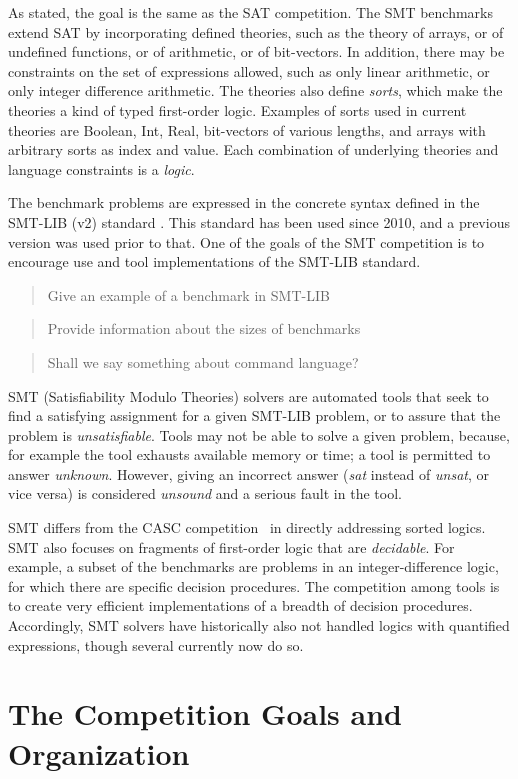 \documentclass[twosize,11pt]{article}
\newcommand{\comment}[2]{\begin{quote}\sc #1\marginpar{\textcolor{red}{$\ast^{\mbox{#2}}$}}\end{quote}}
\newcommand{\tjark}[1]{\comment{#1}{TW}}
\newcommand{\davidd}[1]{\comment{#1}{DD}}
\begin{document}
As stated, the goal is the same as the SAT competition. The SMT benchmarks extend SAT by incorporating defined theories, such as the theory of arrays, or of undefined functions, or of arithmetic, or of bit-vectors. In addition, there may be constraints on the set of expressions allowed, such as only linear arithmetic, or only integer difference arithmetic. The theories also define \textit{sorts}, which make the theories a kind of typed first-order logic. Examples of sorts used in current theories are Boolean, Int, Real, bit-vectors of various lengths, and arrays with arbitrary sorts as index and value. Each combination of underlying theories and language constraints is a \textit{logic}.

The benchmark problems are expressed in the concrete syntax defined in the SMT-LIB (v2) standard \cite{BarST-RR-10}. This standard has been used since 2010, and a previous version was used prior to that. One of the goals of the SMT competition is to encourage use and tool implementations of the SMT-LIB standard.
\tjark{Give an example of a benchmark in SMT-LIB} \tjark{Provide information about the sizes of benchmarks}
\davidd{Shall we say something about command language?}

SMT (Satisfiability Modulo Theories) solvers are automated tools that seek to find a satisfying assignment for a given SMT-LIB problem, or to assure that the problem is \textit{unsatisfiable}.
Tools may not be able to solve a given problem, because, for example the tool exhausts available memory or time; a tool is permitted to answer \textit{unknown}. However, giving an incorrect answer (\textit{sat} instead of \textit{unsat}, or vice versa) is considered \textit{unsound} and a serious fault in the tool.

SMT differs from the CASC competition~\cite{PSS02} in directly addressing sorted logics. SMT also focuses on fragments of first-order logic that are \textit{decidable}. For example, a subset of the benchmarks are problems in an integer-difference logic, for which there are specific decision procedures. The competition among tools is to create very efficient implementations of a breadth of decision procedures. Accordingly, SMT solvers have historically also not handled logics with quantified expressions, though several currently now do so.

\section{The Competition Goals and Organization}
\label{sec:goals}
\end{document}
